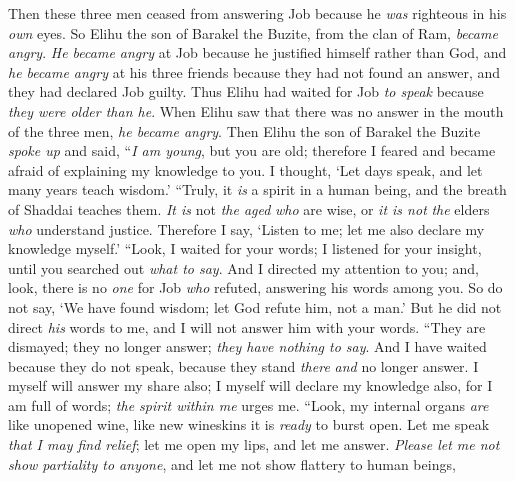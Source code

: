 \begin{biblechapter} %
 Then these three men ceased from answering Job because he \textit{was} righteous in his \textit{own} eyes.
\verse So Elihu the son of Barakel the Buzite, from the clan of Ram, \textit{became angry}. \textit{He became angry} at Job because he justified himself rather than God,
\verse and \textit{he became angry} at his three friends because they had not found an answer, and they had declared Job guilty.
\verse Thus Elihu had waited for Job \textit{to speak} because \textit{they were older than he}.
\verse When Elihu saw that there was no answer in the mouth of the three men, \textit{he became angry}.
\verse Then Elihu the son of Barakel the Buzite \textit{spoke up} and said,
\verse “\textit{I am young}, but you are old; 
therefore I feared and became afraid of explaining my knowledge to you.
\verse I thought, ‘Let days speak, 
and let many years teach wisdom.’
\verse “Truly, it \textit{is} a spirit in a human being, 
and the breath of Shaddai teaches them.
\verse \textit{It is} not \textit{the aged} \textit{who} are wise, 
or \textit{it is not} \textit{the} elders \textit{who} understand justice.
\verse Therefore I say, ‘Listen to me; 
let me also declare my knowledge myself.’
\verse “Look, I waited for your words; 
I listened for your insight, 
until you searched out \textit{what to say}.
\verse And I directed my attention to you; 
and, look, there is no \textit{one} for Job \textit{who} refuted, 
answering his words among you.
\verse So do not say, ‘We have found wisdom; 
let God refute him, not a man.’
\verse But he did not direct \textit{his} words to me, 
and I will not answer him with your words.
\verse “They are dismayed; they no longer answer; 
\textit{they have nothing to say}.
\verse And I have waited because they do not speak, 
because they stand \textit{there} \textit{and} no longer answer.
\verse I myself will answer my share also; 
I myself will declare my knowledge also,
\verse for I am full of words; 
\textit{the spirit within me} urges me.
\verse “Look, my internal organs \textit{are} like unopened wine, 
like new wineskins it is \textit{ready} to burst open.
\verse Let me speak \textit{that I may find relief}; 
let me open my lips, and let me answer.
\verse \textit{Please let me not show partiality to anyone}, 
and let me not show flattery to human beings,
\end{biblechapter}


